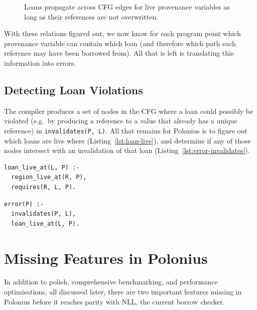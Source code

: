 \documentclass[11pt,a4paper,twoside,openany]{report}
\newenvironment{sourcecode}{\captionsetup{type=listing}}{}
\newcommand{\InDatalog}[1]{\texttt{#1}}
\begin{document}
\begin{figure}
  \caption[Rule for Propagating Loans Across CFG Edges]{Loans propagate across
    CFG edges for live provenance variables as long as their references are not
    overwritten.}\label{fig:requires-edge}
\end{figure}

With these relations figured out, we now know for each program point which
provenance variable can contain which loan (and therefore which path each
reference may have been borrowed from). All that is left is translating this
information into errors.

\subsection{Detecting Loan Violations}

The compiler produces a set of nodes in the CFG where a loan could possibly be
violated (e.g.\ by producing a reference to a value that already has a unique
reference) in \InDatalog{invalidates(P, L)}. All that remains for Polonius is to
figure out which loans are live where (Listing~\ref{lst:loan-live}), and
determine if any of those nodes intersect with an invalidation of that loan
(Listing~\ref{lst:error-invalidates}).

\begin{sourcecode}
  \label{lst:loan-live}
\begin{verbatim}
loan_live_at(L, P) :-
  region_live_at(R, P),
  requires(R, L, P).
\end{verbatim}
\end{sourcecode}

\begin{sourcecode}
  \label{lst:error-invalidates}
\begin{verbatim}
error(P) :-
  invalidates(P, L),
  loan_live_at(L, P).
\end{verbatim}
\end{sourcecode}

\section{Missing Features in Polonius}\label{sec:missing-features}

In addition to polish, comprehensive benchmarking, and performance
optimisations, all discussed later, there are two important features missing
in Polonius before it reaches parity with NLL, the current borrow checker.
\end{document}
